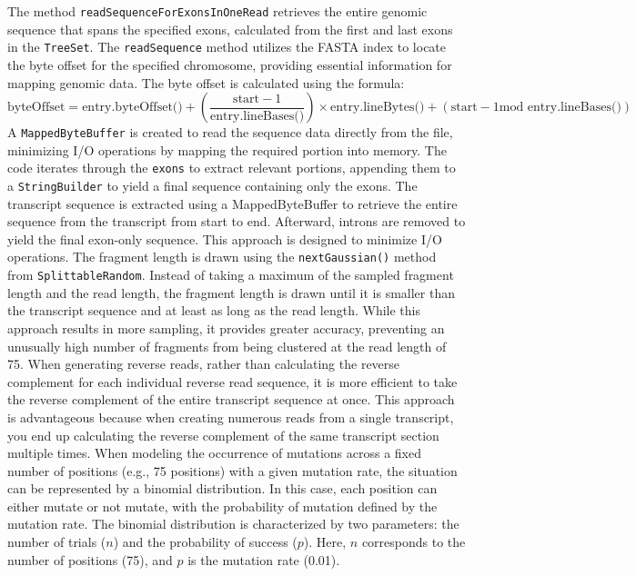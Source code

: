 \documentclass{article}
\begin{document}
    The method \texttt{readSequenceForExonsInOneRead} retrieves the entire genomic sequence that spans the specified exons, calculated from the first and last exons in the \texttt{TreeSet}. The \texttt{readSequence} method utilizes the FASTA index to locate the byte offset for the specified chromosome, providing essential information for mapping genomic data. The byte offset is calculated using the formula:
    \[
        \text{byteOffset} = \text{entry.byteOffset()} + \left(\frac{\text{start} - 1}{\text{entry.lineBases()}}\right) \times \text{entry.lineBytes()} + \left(\text{start} - 1\text{mod entry.lineBases()}\right)
    \]
    A \texttt{MappedByteBuffer} is created to read the sequence data directly from the file, minimizing I/O operations by mapping the required portion into memory. The code iterates through the \texttt{exons} to extract relevant portions, appending them to a \texttt{StringBuilder} to yield a final sequence containing only the exons.
    The transcript sequence is extracted using a MappedByteBuffer to retrieve the entire sequence from the transcript from start to end. Afterward, introns are removed to yield the final exon-only sequence. This approach is designed to minimize I/O operations. The fragment length is drawn using the \texttt{nextGaussian()} method from \texttt{SplittableRandom}. Instead of taking a maximum of the sampled fragment length and the read length, the fragment length is drawn until it is smaller than the transcript sequence and at least as long as the read length. While this approach results in more sampling, it provides greater accuracy, preventing an unusually high number of fragments from being clustered at the read length of 75. When generating reverse reads, rather than calculating the reverse complement for each individual reverse read sequence, it is more efficient to take the reverse complement of the entire transcript sequence at once. This approach is advantageous because when creating numerous reads from a single transcript, you end up calculating the reverse complement of the same transcript section multiple times.
    When modeling the occurrence of mutations across a fixed number of positions (e.g., 75 positions) with a given mutation rate, the situation can be represented by a binomial distribution. In this case, each position can either mutate or not mutate, with the probability of mutation defined by the mutation rate. The binomial distribution is characterized by two parameters: the number of trials ($n$) and the probability of success ($p$). Here, $n$ corresponds to the number of positions (75), and $p$ is the mutation rate (0.01).
\end{document}
